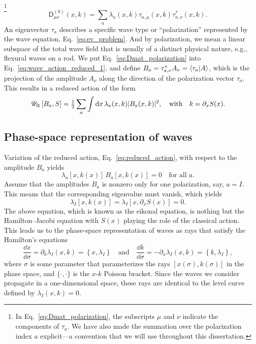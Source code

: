 \footnote{In Eq.~\eqref{eq:Dmat_polarization}, the subscripts $\mu$ and $\nu$ indicate the components of $\tau_{a}$.
We have also made the summation over the polarization index $a$ explicit---a convention that we will use throughout this dissertation.}
%
\begin{equation}
  \mathsf{D}^{(0)}_{\mu\nu}(x, k) = \sum_{a} \lambda_{a}(x, k) \tau_{a, \mu}(x, k) \tau_{a, \nu}^{*}(x, k).
  \label{eq:Dmat_polarization}
\end{equation}
%
An eigenvector $\tau_{a}$ describes a specific wave type or ``polarization'' represented by the wave equation, Eq.~\eqref{eq:ev_problem}.
And by polarization, we mean a linear subspace of the total wave field that is usually of a distinct physical nature, e.g., flexural waves on a rod.
We put Eq.~\eqref{eq:Dmat_polarization} into Eq.~\eqref{eq:wave_action_reduced_1}, and define $B_{a} = \tau_{a, \nu}^{*}A_{\nu} = \mathinner{\langle{\tau_{a}|A}\rangle}$, which is the projection of the amplitude $A_{\nu}$ along the direction of the polarization vector $\tau_{a}$.
This results in a reduced action of the form
%
\begin{equation}
  \mathscr{U}_{\text{R}}\left[B_{a}, S\right] = \tfrac{1}{2} \sum_{a} \int \mathrm{d}{x}\, \lambda_{a}(x,k) \lvert B_{a}(x, k)\rvert^{2},
  \quad\text{with}\quad
  k = \partial_{x}S(x).
  \label{eq:reduced_action}
\end{equation}

\subsection{Phase-space representation of waves}

Variation of the reduced action, Eq.~\eqref{eq:reduced_action}, with respect to the amplitude $B_{a}$ yields
%
\begin{equation}
  \lambda_{a}[x, k(x)]\,B_{a}[x, k(x)] = 0
  \quad\text{for all $a$}.
\end{equation}
%
Assume that the amplitudes $B_{a}$ is nonzero only for one polarization, say, $a = I$.
This means that the corresponding eigenvalue must vanish, which yields
%
\begin{equation}
  \lambda_{I}\left[x, k(x)\right] = \lambda_{I}\left[x, \partial_{x}S(x)\right] = 0.
  \label{eq:eikonal}
\end{equation}
%
The above equation, which is known as the eikonal equation, is nothing but the Hamilton--Jacobi equation with $S(x)$ playing the role of the classical action.
 This leads us to the phase-space representation of waves as rays that satisfy the Hamilton's equations
%
\begin{equation}
  \frac{\dd{x}}{\dd{\sigma}} = \partial_{k}\lambda_{I}(x, k) = \left\{x, \lambda_{I}\right\}
  \quad\text{and}\quad
  \frac{\dd{k}}{\dd{\sigma}} = -\partial_{x}\lambda_{I}(x, k) = \left\{k, \lambda_{I}\right\},
\end{equation}
%
where $\sigma$ is some parameter that parameterizes the rays $[x(\sigma), k(\sigma)]$ in the phase space, and $\{\cdot, \cdot\}$ is the $x$-$k$ Poisson bracket.
Since the waves we consider propagate in a one-dimensional space, these rays are identical to the level curve defined by $\lambda_{I}(x, k) = 0$.

